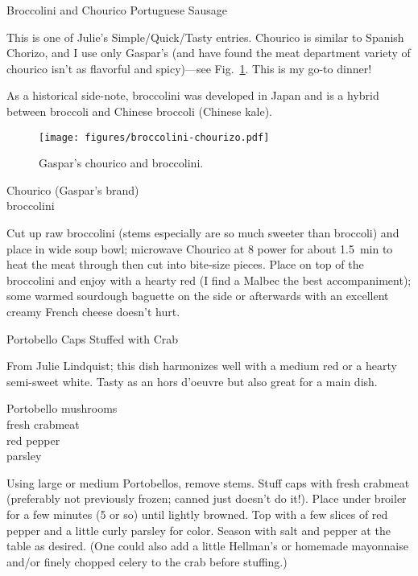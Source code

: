 \begin{entry}{Broccolini and Chourico Portuguese Sausage}

\begin{open}
    This is one of Julie's Simple/Quick/Tasty entries.  Chourico is similar to
    Spanish Chorizo, and I use only Gaspar’s (and have found the meat department
    variety of chourico isn’t as flavorful and spicy)---see
    Fig.~\ref{fig:chourico}. This is my go-to dinner!

    As a historical side-note, broccolini was developed in Japan and is a hybrid
    between broccoli and Chinese broccoli (Chinese kale).
\end{open}
\begin{figure}
  \centering
  \texttt{[image: figures/broccolini-chourizo.pdf]}
  \caption{Gaspar's chourico and broccolini.}
  \label{fig:chourico}
\end{figure}
\begin{ingredients}
    Chourico (Gaspar's brand)\\
    broccolini
\end{ingredients}
Cut up raw broccolini (stems especially are so much sweeter than broccoli) and
place in wide soup bowl; microwave Chourico at 8 power for about
\SI{1.5}{\minute} to heat the meat through then cut into bite-size pieces.
Place on top of the broccolini and enjoy with a hearty red (I find a Malbec the
best accompaniment); some warmed sourdough baguette on the side or afterwards
with an excellent creamy French cheese doesn’t hurt.
\end{entry}

\begin{entry}{Portobello Caps Stuffed with Crab
}

\begin{open}
  From Julie Lindquist; this dish harmonizes well with a medium red or a
  hearty semi-sweet white. Tasty as an hors d'oeuvre but also great for a main
  dish.
\end{open}
\begin{ingredients}
    Portobello mushrooms\\
    fresh crabmeat\\
    red pepper\\
    parsley
\end{ingredients}
Using large or medium Portobellos, remove stems. Stuff caps with fresh
crabmeat (preferably not previously frozen; canned just doesn't do it!). Place
under broiler for a few minutes (5 or so) until lightly browned. Top with a
few slices of red pepper and a little curly parsley for color. Season with
salt and pepper at the table as desired.  (One could also add a little
Hellman’s or homemade mayonnaise and/or finely chopped celery to the crab
before stuffing.)
\end{entry}

